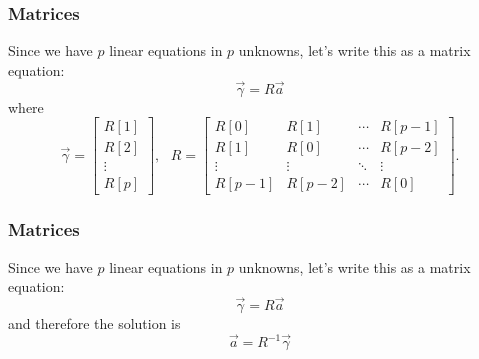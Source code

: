 \documentclass{beamer}
\begin{document}
\begin{frame}
  \frametitle{Matrices}

  Since we have $p$ linear equations in $p$ unknowns, let's write this
  as a matrix equation:
  \begin{displaymath}
    \vec\gamma = R \vec{a}
  \end{displaymath}
  where
  \begin{displaymath}
    \vec\gamma = \left[\begin{array}{c}R[1]\\ R[2]\\\vdots\\ R[p]\end{array}\right],~~~
    R = \left[\begin{array}{cccc} R[0] & R[1] &  \cdots & R[p-1] \\
        R[1] & R[0] & \cdots & R[p-2] \\
        \vdots & \vdots & \ddots & \vdots \\
        R[p-1] & R[p-2] & \cdots & R[0] \end{array}\right].
  \end{displaymath}
\end{frame}

\begin{frame}
  \frametitle{Matrices}

  Since we have $p$ linear equations in $p$ unknowns, let's write this
  as a matrix equation:
  \begin{displaymath}
    \vec\gamma = R \vec{a}
  \end{displaymath}
  and therefore the solution is
  \begin{displaymath}
    \vec{a} = R^{-1} \vec\gamma
  \end{displaymath}
\end{frame}
\end{document}
